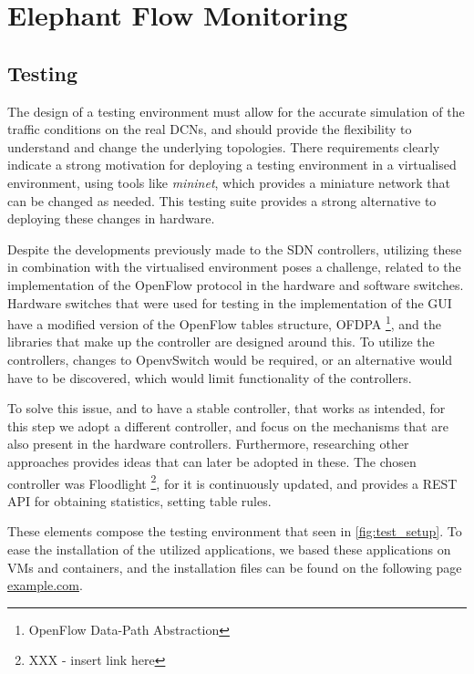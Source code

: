 \chapter{Elephant Flow Monitoring} \label{chap:me} 

\section {Testing}

The design of a testing environment must allow for the accurate simulation of the traffic conditions on the real DCNs, and should provide the flexibility to 
understand and change the underlying topologies. There requirements clearly indicate a strong motivation for deploying a testing environment in a virtualised
environment, using tools like \textit{mininet}, which provides a miniature network that can be changed as needed. This testing suite provides a strong 
alternative to deploying these changes in hardware.

\par Despite the developments previously made to the SDN controllers, utilizing these in combination with the virtualised environment poses a challenge, related 
to the implementation of the OpenFlow protocol in the hardware and software switches. Hardware switches that were used for testing in the implementation of
the GUI have a modified version of the OpenFlow tables structure, OFDPA \footnote{OpenFlow Data-Path Abstraction}, and the libraries that make up the 
controller are designed around this. To utilize the controllers, changes to OpenvSwitch would be required, or an alternative would have to be 
discovered, which would limit functionality of the controllers.

\par To solve this issue, and to have a stable controller, that works as intended, for this step we adopt a different controller, and focus on the mechanisms that 
are also present in the hardware controllers. Furthermore, researching other approaches provides ideas that can later be adopted in these. The chosen controller
was Floodlight \footnote { XXX - insert link here}, for it is continuously updated, and provides a REST API for obtaining statistics, setting table rules.

\par These elements compose the testing environment that seen in \ref{fig:test_setup}. To ease the installation of the utilized applications, 
we based these applications on VMs and containers, and the installation files can be found on the following page \url {example.com}.

